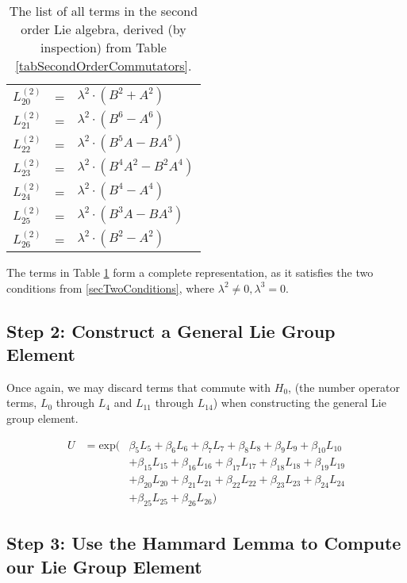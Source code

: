 \documentclass{article}
\begin{document}
\begin{table}[!hp]
\begin{center}
\begin{tabular}{rcl}
$L_{20}^{(2)}$ & = & ${\lambda}^{2}{\cdot}(B^{2}+A^{2})$ \\
$L_{21}^{(2)}$ & = & ${\lambda}^{2}{\cdot}(B^{6}-A^{6})$ \\
$L_{22}^{(2)}$ & = & ${\lambda}^{2}{\cdot}(B^{5}A-BA^{5})$ \\
$L_{23}^{(2)}$ & = & ${\lambda}^{2}{\cdot}(B^{4}A^{2}-B^{2}A^{4})$ \\
$L_{24}^{(2)}$ & = & ${\lambda}^{2}{\cdot}(B^{4}-A^{4})$ \\
$L_{25}^{(2)}$ & = & ${\lambda}^{2}{\cdot}(B^{3}A-BA^{3})$ \\
$L_{26}^{(2)}$ & = & ${\lambda}^{2}{\cdot}(B^{2}-A^{2})$
\end{tabular}
\caption{The list of all terms in the second order Lie algebra, derived (by inspection) from Table \ref{tabSecondOrderCommutators}. \label{tabSecondOrderCompleteTermList}}
\end{center}
\end{table}

The terms in Table \ref{tabSecondOrderCompleteTermList} form a complete representation, as it satisfies the two conditions from \ref{secTwoConditions}, where $\lambda^{2} \neq 0, \lambda^{3} = 0$.

\newpage

\subsection{Step 2: Construct a General Lie Group Element}

Once again, we may discard terms that commute with $H_{0}$, (the number operator terms, $L_{0}$ through $L_{4}$ and $L_{11}$ through $L_{14}$) when constructing the general Lie group element.

\begin{eqnarray}
U & = \textrm{exp}( & \beta_{5}L_{5}+\beta_{6}L_{6}+\beta_{7}L_{7}+\beta_{8}L_{8}+\beta_{9}L_{9}+\beta_{10}L_{10} \\
  &                 & +\beta_{15}L_{15}+\beta_{16}L_{16}+\beta_{17}L_{17}+\beta_{18}L_{18}+\beta_{19}L_{19} \nonumber \\
  &                 & +\beta_{20}L_{20}+\beta_{21}L_{21}+\beta_{22}L_{22}+\beta_{23}L_{23}+\beta_{24}L_{24} \nonumber \\
  &                 & +\beta_{25}L_{25}+\beta_{26}L_{26} ) \nonumber
\end{eqnarray}

\subsection{Step 3: Use the Hammard Lemma to Compute our Lie Group Element}
\end{document}
